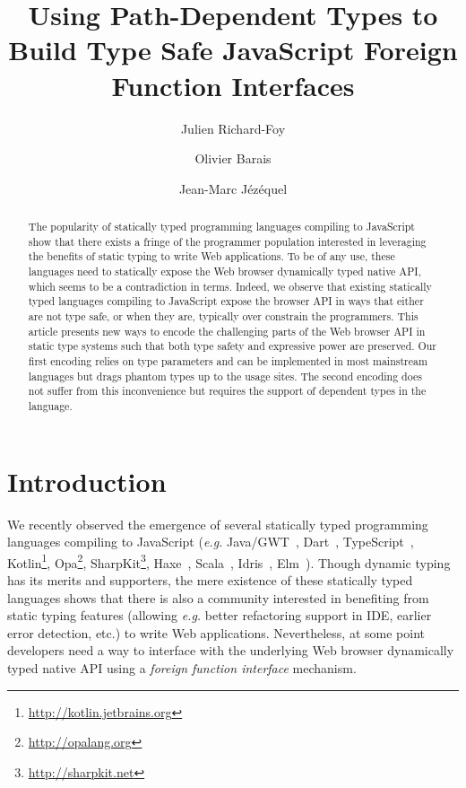 \documentclass{llncs}
\begin{document}
\renewcommand{\thelstlisting}{\arabic{lstlisting}}

 \title{Using Path-Dependent Types to Build Type Safe JavaScript Foreign Function Interfaces}

 \author{Julien Richard-Foy \and Olivier Barais \and Jean-Marc J\'ez\'equel}



 \maketitle

\begin{abstract}
The popularity of statically typed programming languages compiling to JavaScript show that there exists a fringe of the programmer population interested in leveraging the benefits of static typing to write Web applications. To be of any use, these languages need to statically expose the Web browser dynamically typed native API, which seems to be a contradiction in terms. Indeed, we observe that existing statically typed languages compiling to JavaScript expose the browser API in ways that either are not type safe, or when they are, typically over constrain the programmers. This article presents new ways to encode the challenging parts of the Web browser API in static type systems such that both type safety and expressive power are preserved. Our first encoding relies on type parameters and can be implemented in most mainstream languages but drags phantom types up to the usage sites. The second encoding does not suffer from this inconvenience but requires the support of dependent types in the language.
\end{abstract}

\section{Introduction}

We recently observed the emergence of several statically typed programming languages compiling to JavaScript (\emph{e.g.} Java/GWT~\cite{Kereki09_GWT}, Dart~\cite{Griffith11_Dart}, TypeScript~\cite{fenton2012typescript}, Kotlin\footnote{\href{http://kotlin.jetbrains.org}{http://kotlin.jetbrains.org}}, Opa\footnote{\href{http://opalang.org}{http://opalang.org}}, SharpKit\footnote{\href{http://sharpkit.net}{http://sharpkit.net}}, Haxe~\cite{Cannasse08_HaXe}, Scala~\cite{Doeraene13_ScalaJs}, Idris~\cite{Brady13_Idris}, Elm~\cite{czaplicki2012elm}). Though dynamic typing has its merits and supporters, the mere existence of these statically typed languages shows that there is also a community interested in benefiting from static typing features (allowing \emph{e.g.} better refactoring support in IDE, earlier error detection, etc.) to write Web applications. Nevertheless, at some point developers need a way to interface with the underlying Web browser dynamically typed native API using a \emph{foreign function 
interface} mechanism.
\end{document}
